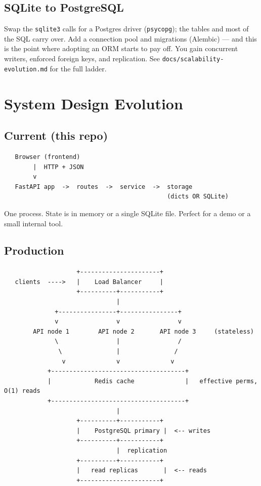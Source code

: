 \documentclass[11pt,a4paper]{report}
\begin{document}
\section{SQLite to PostgreSQL}
Swap the \texttt{sqlite3} calls for a Postgres driver (\texttt{psycopg}); the
tables and most of the SQL carry over. Add a connection pool and migrations
(Alembic) --- and this is the point where adopting an ORM starts to pay off. You
gain concurrent writers, enforced foreign keys, and replication. See
\texttt{docs/scalability-evolution.md} for the full ladder.

\chapter{System Design Evolution}

\section{Current (this repo)}
\begin{verbatim}
   Browser (frontend)
        |  HTTP + JSON
        v
   FastAPI app  ->  routes  ->  service  ->  storage
                                             (dicts OR SQLite)
\end{verbatim}
One process. State is in memory or a single SQLite file. Perfect for a demo or a
small internal tool.

\section{Production}
\begin{verbatim}
                    +----------------------+
   clients  ---->   |    Load Balancer     |
                    +----------+-----------+
                               |
              +----------------+----------------+
              v                v                v
        API node 1        API node 2       API node 3     (stateless)
              \                |                /
               \               |               /
                v              v              v
            +-------------------------------------+
            |            Redis cache              |   effective perms, O(1) reads
            +-------------------------------------+
                               |
                    +----------+-----------+
                    |    PostgreSQL primary |  <-- writes
                    +----------+-----------+
                               |  replication
                    +----------+-----------+
                    |   read replicas       |  <-- reads
                    +----------------------+
\end{verbatim}
\end{document}
